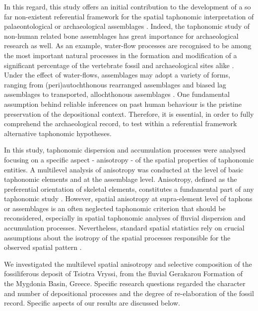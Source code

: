 \documentclass[review,times,authoryear]{elsarticle} %
\begin{document}
In this regard, this study offers an initial contribution to the development of a so far non-existent referential framework for the spatial taphonomic interpretation of palaeontological or archaeological assemblages \citep{Dominguez-Rodrigo2017}. Indeed, the taphonomic study of non-human related bone assemblages has great importance for archaeological research as well. As an example, water-flow processes are recognised to be among the most important natural processes in the formation and modification of a significant percentage of the vertebrate fossil and archaeological sites alike \citep[][among others]{Behrensmeyer1975,Behrensmeyer1982,Behrensmeyer1988,Coard1995,Coard1999,Petraglia1987,Petraglia1994,Schiffer1987,Voorhies1969}. Under the effect of water-flows, assemblages may adopt a variety of forms, ranging from (peri)autochthonous rearranged assemblages and biased lag assemblages to transported, allochthonous assemblages \citep{Behrensmeyer1988,Dominguez-Rodrigo2013}. One fundamental assumption behind reliable inferences on past human behaviour is the pristine preservation of the depositional context. Therefore, it is essential, in order to fully comprehend the archaeological record, to test within a referential framework alternative taphonomic hypotheses.

In this study, taphonomic dispersion and accumulation processes were analysed focusing on a specific aspect - anisotropy - of the spatial properties of taphonomic entities. A multilevel analysis of anisotropy was conducted at the level of basic taphonomic elements and at the assemblage level. Anisotropy, defined as the preferential orientation of skeletal elements, constitutes a fundamental part of any taphonomic study \citep[][among others]{Toots1965,Voorhies1969,Nash1987,Schick1987a,Petraglia1987,Petraglia1994,Fiorillo1991,Benito-Calvo2011,Torre2013a,Dominguez-Rodrigo2012,Dominguez-Rodrigo2014,Dominguez-Rodrigo2014c,Cobo-Sanchez2014,Aramendi2017,Organista2017}. However, spatial anisotropy at supra-element level of taphons or assemblages is an often neglected taphonomic criterion that should be reconsidered, especially in spatial taphonomic analyses of fluvial dispersion and accumulation processes. Nevertheless, standard spatial statistics rely on crucial assumptions about the isotropy of the spatial processes responsible for the observed spatial pattern \citep{spatstatBook}.

We investigated the multilevel spatial anisotropy and selective composition of the fossiliferous deposit of Tsiotra Vryssi, from the fluvial Gerakarou Formation of the Mygdonia Basin, Greece. Specific research questions regarded the character and number of depositional processes and the degree of re-elaboration of the fossil record. Specific aspects of our results are discussed below.
\end{document}
